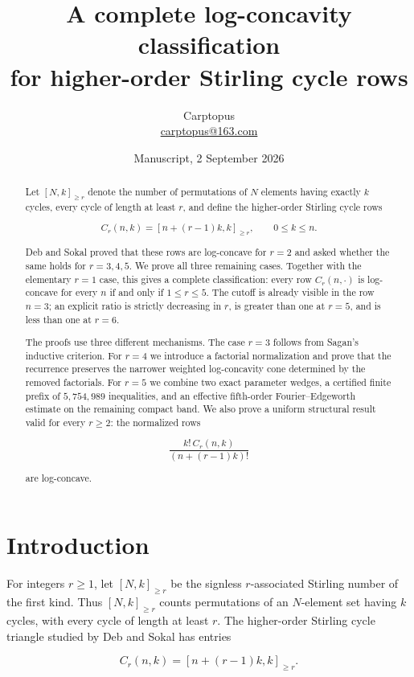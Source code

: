 \documentclass[11pt]{article}
\title{A complete log-concavity classification\\
for higher-order Stirling cycle rows}
\author{Carptopus\\\href{mailto:carptopus@163.com}{carptopus@163.com}}
\date{Manuscript, 2 September 2026}
\numberwithin{equation}{section}
\begin{document}
\maketitle

\begin{abstract}

Let $[N,k]_{\ge r}$ denote the number of permutations of $N$ elements having exactly $k$
cycles, every cycle of length at least $r$, and define the higher-order Stirling cycle rows

\[
C_r(n,k)=[n+(r-1)k,k]_{\ge r},\qquad 0\le k\le n.
\]

Deb and Sokal proved that these rows are log-concave for $r=2$ and asked whether the same
holds for $r=3,4,5$. We prove all three remaining cases. Together with the elementary
$r=1$ case, this gives a complete classification: every row $C_r(n,\cdot)$ is log-concave
for every $n$ if and only if $1\le r\le5$. The cutoff is already visible in the row $n=3$;
an explicit ratio is strictly decreasing in $r$, is greater than one at $r=5$, and is less
than one at $r=6$.

The proofs use three different mechanisms. The case $r=3$ follows from Sagan's inductive
criterion. For $r=4$ we introduce a factorial normalization and prove that the recurrence
preserves the narrower weighted log-concavity cone determined by the removed factorials.
For $r=5$ we combine two exact parameter wedges, a certified finite prefix of $5,754,989$
inequalities, and an effective fifth-order Fourier--Edgeworth estimate on the remaining
compact band. We also prove a uniform structural result valid for every $r\ge2$: the
normalized rows

\[
\frac{k!\,C_r(n,k)}{(n+(r-1)k)!}
\]

are log-concave.

\end{abstract}

\section{Introduction}


For integers $r\ge1$, let $[N,k]_{\ge r}$ be the signless $r$-associated Stirling number
of the first kind. Thus $[N,k]_{\ge r}$ counts permutations of an $N$-element set having
$k$ cycles, with every cycle of length at least $r$. The higher-order Stirling cycle
triangle studied by Deb and Sokal \cite{deb-sokal} has entries

\[
C_r(n,k)=[n+(r-1)k,k]_{\ge r}.
\tag{1.1}
\]
\end{document}
